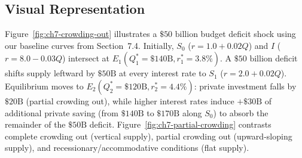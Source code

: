 \documentclass[11pt,letterpaper]{article}
\begin{document}
\subsection*{Visual Representation}
Figure~\ref{fig:ch7-crowding-out} illustrates a $\$50\text{ billion}$ budget deficit shock using our baseline curves from Section~7.4. Initially, $S_0$ ($r = 1.0 + 0.02Q$) and $I$ ($r = 8.0 - 0.03Q$) intersect at $E_1(Q_1^* = \$140\text{B}, r_1^* = 3.8\%)$. A $\$50\text{ billion}$ deficit shifts supply leftward by $\$50\text{B}$ at every interest rate to $S_1$ ($r = 2.0 + 0.02Q$). Equilibrium moves to $E_2(Q_2^* = \$120\text{B}, r_2^* = 4.4\%)$: private investment falls by $\$20\text{B}$ (partial crowding out), while higher interest rates induce $+\$30\text{B}$ of additional private saving (from $\$140\text{B}$ to $\$170\text{B}$ along $S_0$) to absorb the remainder of the $\$50\text{B}$ deficit. Figure~\ref{fig:ch7-partial-crowding} contrasts complete crowding out (vertical supply), partial crowding out (upward-sloping supply), and recessionary/accommodative conditions (flat supply).
\end{document}
